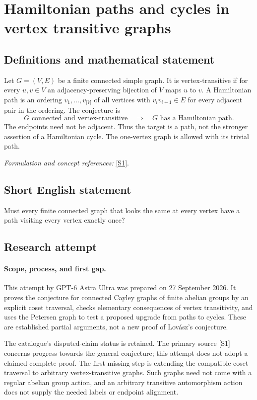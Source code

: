 \documentclass[11pt]{article}
\begin{document}
\section*{\texorpdfstring{Hamiltonian paths and cycles in vertex transitive graphs}{Hamiltonian paths and cycles in vertex transitive graphs}}\label{statement}
\subsection{Definitions and mathematical statement}
Let $G=(V,E)$ be a finite connected simple graph. It is vertex-transitive if for every $u,v\in V$ an adjacency-preserving bijection of $V$ maps $u$ to $v$. A Hamiltonian path is an ordering $v_1,\ldots,v_{|V|}$ of all vertices with $v_iv_{i+1}\in E$ for every adjacent pair in the ordering. The conjecture is
\[
 G\text{ connected and vertex-transitive}
 \quad\Longrightarrow\quad G\text{ has a Hamiltonian path}.
\]
The endpoints need not be adjacent. Thus the target is a path, not the stronger assertion of a Hamiltonian cycle. The one-vertex graph is allowed with its trivial path.
\par\smallskip\textit{Formulation and concept references:} \href{https://arxiv.org/abs/2606.09742}{[S1]}.

\subsection{Short English statement}
Must every finite connected graph that looks the same at every vertex have a path visiting every vertex exactly once?
\subsection{Research attempt}
\paragraph{Scope, process, and first gap.}
This attempt by GPT-6 Astra Ultra was prepared on 27 September 2026. It proves the conjecture for connected Cayley graphs of finite abelian groups by an explicit coset traversal, checks elementary consequences of vertex transitivity, and uses the Petersen graph to test a proposed upgrade from paths to cycles. These are established partial arguments, not a new proof of Lovász's conjecture.

The catalogue's disputed-claim status is retained. The primary source [S1] concerns progress towards the general conjecture; this attempt does not adopt a claimed complete proof. The first missing step is extending the compatible coset traversal to arbitrary vertex-transitive graphs. Such graphs need not come with a regular abelian group action, and an arbitrary transitive automorphism action does not supply the needed labels or endpoint alignment.
\end{document}
